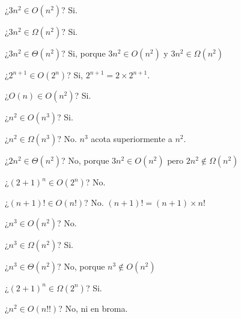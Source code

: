 \documentclass[a4paper, 11pt]{article}
\begin{document}
\begin{itemize}
	{\color{ForestGreen}
\item ¿$3n^2 \in O(n^2)$? Si.
\item ¿$3n^2 \in \Omega(n^2)$?  Si.
\item ¿$3n^2 \in \Theta(n^2)$?  Si, porque $3n^2 \in O(n^2)$ y $3n^2 \in \Omega(n^2)$
\item ¿$2^{n+1} \in O(2^n)$?  Si, $2^{n+1} = 2\times2^{n+1}$.
\item ¿$O(n) \in O(n^2)$?  Si. 
\item ¿$n^2 \in O(n^3)$? Si.
} {\color{red} 
\item ¿$n^2 \in \Omega(n^3)$? No. $n^3$ acota superiormente a $n^2$. 
\item ¿$2n^2 \in \Theta(n^2)$?  No, porque $3n^2 \in O(n^2)$ pero $2n^2 \notin \Omega(n^2)$
\item ¿$(2+1)^n \in O(2^n)$? No. 
\item ¿$(n+1)! \in O(n!)$? No. $(n+1)! = (n+1)\times n!$ 
\item ¿$n^3 \in O(n^2)$? No.
} {\color{ForestGreen} 
\item ¿$n^3 \in \Omega(n^2)$? Si.
} {\color{red}
\item ¿$n^3 \in \Theta(n^2)$? No, porque $n^3 \notin O(n^2)$
}{\color{ForestGreen}
\item ¿$(2+1)^n \in \Omega(2^n)$? Si. 
}{\color{red}
\item ¿$n^2 \in O(n!!)$? No, ni en broma. 
}
\end{itemize}




 
\end{document}
